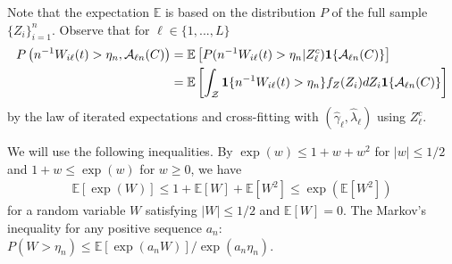 \documentclass[lettersize, 12pt]{article}
\begin{document}
{Note that the expectation $\mathbb{E}$ is based on the distribution $P$ of the full sample $\{Z_i\}_{i=1}^n$.
Observe that for $\ell\in\{1,...,L\}$
\begin{align}
P\left(  n^{-1}W_{i\ell}(t)  > \eta_n, \mathcal{A}_{\ell n}(C) \right) 
&= \mathbb{E}\left[
P(n^{-1}W_{i\ell}(t)  > \eta_n|Z_\ell^c){\bf 1}\{\mathcal{A}_{\ell n}(C)\} 
\right]\notag \\
&= \mathbb{E}\left[
\int_{\mathcal{Z}}
{\bf 1}\{n^{-1}W_{i\ell}(t)  > \eta_n\} 
f_Z(Z_i) dZ_i{\bf 1}\{\mathcal{A}_{\ell n}(C) \}
\right]
\label{EqFHLZ}
\end{align}
by the law of iterated expectations and cross-fitting with $(\hat\gamma_\ell, \hat \lambda_\ell)$ using $Z_\ell^c$.

We will use the following inequalities. 
By $\exp(w) \leq 1 + w + w^2$ for $|w| \leq 1/2$ and $1+w\leq \exp(w)$ for $w \geq 0$,
we have 
\begin{align}
\mathbb{E}[\exp(W)] \leq 1 + \mathbb{E}[W] + \mathbb{E}[W^2]\leq \exp(\mathbb{E}[W^2])
\label{IE1}
 \end{align}
for a random variable $W$ satisfying $|W| \leq 1/2$ and $\mathbb{E}[W] = 0$.
The Markov's inequality for any positive sequence $a_n$: $P(W > \eta_n) \leq \mathbb{E}[\exp(a_nW)]/\exp(a_n\eta_n)$.


}
\end{document}
